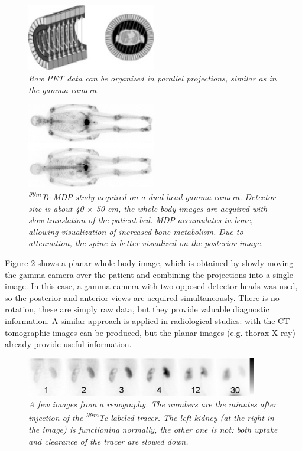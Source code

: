 \documentclass[11pt,oneside]{book}
\begin{document}
\begin{figure}[tb]
\centering
\includegraphics[width=0.5\textwidth]{figs/fig_pet_parallel.pdf}
\caption{\label{fig:pet_parallel} \emph{Raw PET data can be organized in
parallel projections, similar as in the gamma camera.}}
\end{figure}

\begin{figure}[tb]
\centering
\includegraphics[width=0.5\textwidth]{figs/fig_jnwb.pdf}
\caption{\label{fig:planarwb} \emph{\textsuperscript{99m}Tc-MDP study acquired on a dual
head gamma camera. Detector size is about 40 $\times$ 50 cm, the whole body
images are acquired with slow translation of the patient bed. MDP accumulates
in bone, allowing visualization of increased bone metabolism. Due to
attenuation, the spine is better visualized on the posterior image.}}
\end{figure}

Figure \ref{fig:planarwb} shows a planar whole body image, which is obtained
by slowly moving the gamma camera over the patient and combining the
projections into a single image. In this case, a gamma camera with two opposed
detector heads was used, so the posterior and anterior views are acquired
simultaneously. There is no rotation, these are simply raw data, but they
provide valuable diagnostic information. A similar approach is applied in
radiological studies: with the CT tomographic images can be produced, but the
planar images (e.g. thorax X-ray) already provide useful information. 

\begin{figure}[tb]
\centering
\includegraphics[width=0.9\textwidth]{figs/fig_renaldynimg.pdf}
\caption{\label{fig:renaldyn} \emph{A few images from a
    renography. The numbers are the minutes after injection of the
    \textsuperscript{99m}Tc-labeled tracer. The left kidney (at the right in the
    image) is functioning normally, the other one is not: both uptake
    and clearance of the tracer are slowed down.}}
\end{figure}
\end{document}
